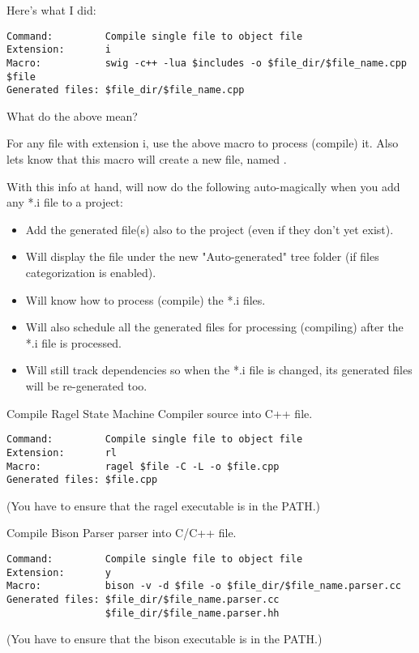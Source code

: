 Here's what I did: 
\begin{verbatim}
Command:         Compile single file to object file
Extension:       i
Macro:           swig -c++ -lua $includes -o $file_dir/$file_name.cpp $file
Generated files: $file_dir/$file_name.cpp
\end{verbatim}

What do the above mean?

For any file with extension i, use the above macro to process (compile) it. Also lets \codeblocks know that this macro will create a new file, named .

With this info at hand, \codeblocks will now do the following auto-magically when you add any *.i file to a project:
\begin{itemize}
\item Add the generated file(s) also to the project (even if they don't yet exist).
\item Will display the file under the new "Auto-generated" tree folder (if files categorization is enabled).
\item Will know how to process (compile) the *.i files.
\item Will also schedule all the generated files for processing (compiling) after the *.i file is processed.
\item Will still track dependencies so when the *.i file is changed, its generated files will be re-generated too.
\end{itemize}


Compile Ragel State Machine Compiler source into C++ file.
\begin{verbatim}
Command:         Compile single file to object file
Extension:       rl
Macro:           ragel $file -C -L -o $file.cpp
Generated files: $file.cpp
\end{verbatim}
(You have to ensure that the ragel executable is in the PATH.)\newline


Compile Bison Parser parser into C/C++ file.
\begin{verbatim}
Command:         Compile single file to object file
Extension:       y
Macro:           bison -v -d $file -o $file_dir/$file_name.parser.cc
Generated files: $file_dir/$file_name.parser.cc
                 $file_dir/$file_name.parser.hh
\end{verbatim}
(You have to ensure that the bison executable is in the PATH.)\newline

